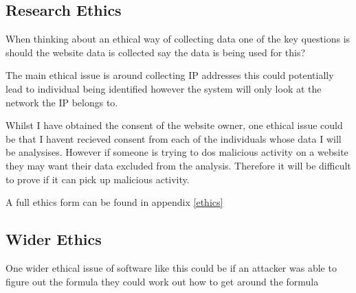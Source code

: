 \subsection{Research Ethics}

When thinking about an ethical way of collecting data one of the key questions is should the website data is collected say the data is being used for this?

The main ethical issue is around collecting IP addresses this could potentially lead to individual being identified however the system will only look at the network the IP belongs to. 

Whilst I have obtained the consent of the website owner, one ethical issue could be that I havent recieved consent from each of the individuals whose data I will be analysises. However if someone is trying to dos malicious activity on a website they may want their data excluded from the analysis. Therefore it will be difficult to prove if it can pick up malicious activity.

A full ethics  form can be found in appendix \ref{ethics}

\subsection{Wider Ethics}

One wider ethical issue of software like this could be if an attacker was able to figure out the formula they could work out how to get around the formula